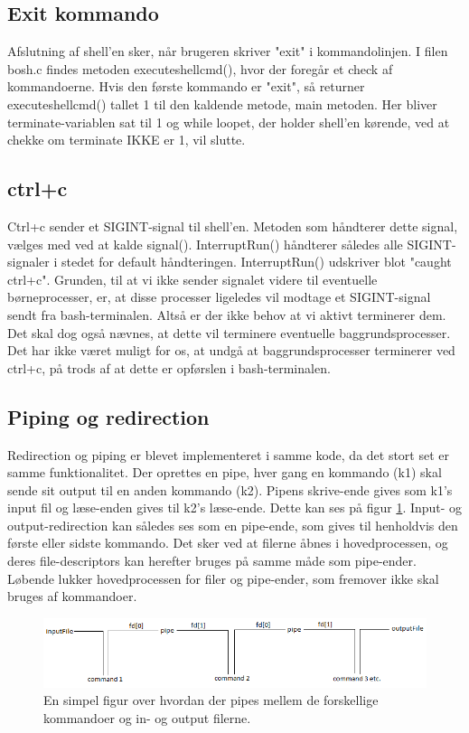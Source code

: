 \subsection{Exit kommando}
Afslutning af shell'en sker, når brugeren skriver "exit" i kommandolinjen. I filen bosh.c findes metoden executeshellcmd(), hvor der foregår et check af kommandoerne. Hvis den første kommando er "exit", så returner executeshellcmd() tallet 1 til den kaldende metode, main metoden. Her bliver terminate-variablen sat til 1 og while loopet, der holder shell'en kørende, ved at chekke om terminate IKKE er 1, vil slutte.

\subsection{ctrl+c}
Ctrl+c sender et SIGINT-signal til shell'en. Metoden som håndterer dette signal, vælges med ved at kalde signal(). InterruptRun() håndterer således alle SIGINT-signaler i stedet for default håndteringen. InterruptRun() udskriver blot "caught ctrl+c". Grunden, til at vi ikke sender signalet videre til eventuelle børneprocesser, er, at disse processer ligeledes vil modtage et SIGINT-signal sendt fra bash-terminalen. Altså er der ikke behov at vi aktivt terminerer dem. Det skal dog også nævnes, at dette vil terminere eventuelle baggrundsprocesser. 
Det har ikke været muligt for os, at undgå at baggrundsprocesser terminerer ved ctrl+c, på trods af at dette er opførslen i bash-terminalen.

\subsection{Piping og redirection}
\label{subsec:pipe_redirect}
Redirection og piping er blevet implementeret i samme kode, da det stort set er samme funktionalitet.
Der oprettes en pipe, hver gang en kommando (k1) skal sende sit output til en anden kommando (k2). Pipens skrive-ende gives som k1's input fil og læse-enden gives til k2's læse-ende. Dette kan ses på figur \ref{fig:pipe}. Input- og output-redirection kan således ses som en pipe-ende, som gives til henholdvis den første eller sidste kommando. Det sker ved at filerne åbnes i hovedprocessen, og deres file-descriptors kan herefter bruges på samme måde som pipe-ender. Løbende lukker hovedprocessen for filer og pipe-ender, som fremover ikke skal bruges af kommandoer.


\vspace{1cm}
\begin{figure}
\includegraphics[scale=0.7, trim= 2cm 0cm 0cm 0cm]{pipefig}
\caption{En simpel figur over hvordan der pipes mellem de forskellige kommandoer og in- og output filerne.}
\label{fig:pipe}
\end{figure}
\vspace{1cm}

